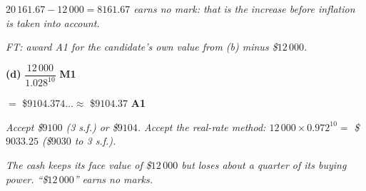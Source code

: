\documentclass[12pt, twoside]{article}
\begin{document}
\begin{enumerate}[itemsep=0.3cm]
\emph{$20\,161.67 - 12\,000 = 8161.67$ earns no mark: that is the
increase before inflation is taken into account.}

\emph{FT: award A1 for the candidate's own value from (b) minus
\$$12\,000$.}

\medskip

\textbf{(d)} $\dfrac{12\,000}{1.028^{10}}$ \hfill \textbf{M1}

$=$ \$$9104.374\ldots \approx$ \$$9104.37$ \hfill \textbf{A1}

\emph{Accept \$$9100$ (3 s.f.) or \$$9104$. Accept the real-rate method:
$12\,000 \times 0.972^{10} = $ \$$9033.25$ (\$$9030$ to 3 s.f.).}

\emph{The cash keeps its face value of \$$12\,000$ but loses about
a quarter of its buying power. ``\$$12\,000$'' earns no marks.}

\end{enumerate}
\end{document}
